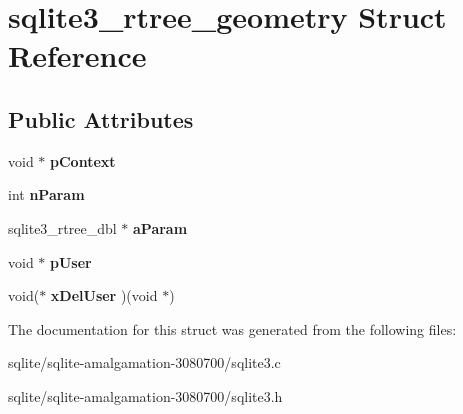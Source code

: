 \hypertarget{structsqlite3__rtree__geometry}{\section{sqlite3\+\_\+rtree\+\_\+geometry Struct Reference}
\label{structsqlite3__rtree__geometry}
}
\subsection*{Public Attributes}
\begin{DoxyCompactItemize}
\item 
\hypertarget{structsqlite3__rtree__geometry_a33f98691626846c1317419654d5c5f51}{void $\ast$ {\bfseries p\+Context}}\label{structsqlite3__rtree__geometry_a33f98691626846c1317419654d5c5f51}

\item 
\hypertarget{structsqlite3__rtree__geometry_ada7b9eba82660e3321dd4c93526697c9}{int {\bfseries n\+Param}}\label{structsqlite3__rtree__geometry_ada7b9eba82660e3321dd4c93526697c9}

\item 
\hypertarget{structsqlite3__rtree__geometry_a42eafbc0dcb02ed32a0a4b10ff887416}{sqlite3\+\_\+rtree\+\_\+dbl $\ast$ {\bfseries a\+Param}}\label{structsqlite3__rtree__geometry_a42eafbc0dcb02ed32a0a4b10ff887416}

\item 
\hypertarget{structsqlite3__rtree__geometry_a6fdedfd741cf5055f9562298cd32dc74}{void $\ast$ {\bfseries p\+User}}\label{structsqlite3__rtree__geometry_a6fdedfd741cf5055f9562298cd32dc74}

\item 
\hypertarget{structsqlite3__rtree__geometry_afa1ed10f488b306df354efe56efdf287}{void($\ast$ {\bfseries x\+Del\+User} )(void $\ast$)}\label{structsqlite3__rtree__geometry_afa1ed10f488b306df354efe56efdf287}

\end{DoxyCompactItemize}


The documentation for this struct was generated from the following files\+:\begin{DoxyCompactItemize}
\item 
sqlite/sqlite-\/amalgamation-\/3080700/sqlite3.\+c\item 
sqlite/sqlite-\/amalgamation-\/3080700/sqlite3.\+h\end{DoxyCompactItemize}
